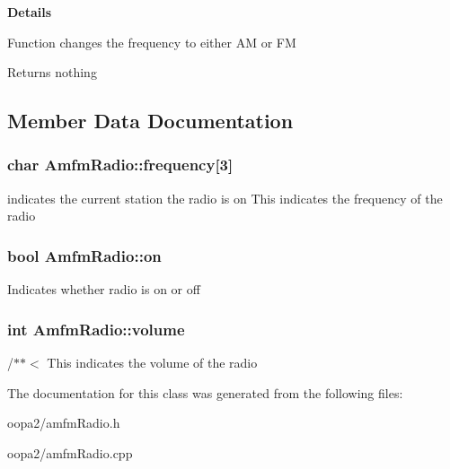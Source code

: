 {\bfseries Details}

Function changes the frequency to either A\-M or F\-M

\begin{DoxyReturn}{Returns}
nothing 
\end{DoxyReturn}


\subsection{Member Data Documentation}
\hypertarget{class_amfm_radio_af9816519f446eac6b34e511d5d5d1fd8}{
\subsubsection[{frequency}]{\setlength{\rightskip}{0pt plus 5cm}char Amfm\-Radio\-::frequency\mbox{[}3\mbox{]}\hspace{0.3cm}{\ttfamily [private]}}}\label{class_amfm_radio_af9816519f446eac6b34e511d5d5d1fd8}
indicates the current station the radio is on This indicates the frequency of the radio \hypertarget{class_amfm_radio_a018c619e4fde3bfb20a9d1c6117dc1f2}{
\subsubsection[{on}]{\setlength{\rightskip}{0pt plus 5cm}bool Amfm\-Radio\-::on\hspace{0.3cm}{\ttfamily [private]}}}\label{class_amfm_radio_a018c619e4fde3bfb20a9d1c6117dc1f2}
Indicates whether radio is on or off \hypertarget{class_amfm_radio_ad8985cd1b3a2fd7011701d62631395fc}{
\subsubsection[{volume}]{\setlength{\rightskip}{0pt plus 5cm}int Amfm\-Radio\-::volume\hspace{0.3cm}{\ttfamily [private]}}}\label{class_amfm_radio_ad8985cd1b3a2fd7011701d62631395fc}
/$\ast$$\ast$$<$ This indicates the volume of the radio 

The documentation for this class was generated from the following files\-:\begin{DoxyCompactItemize}
\item 
oopa2/amfm\-Radio.\-h\item 
oopa2/amfm\-Radio.\-cpp\end{DoxyCompactItemize}
